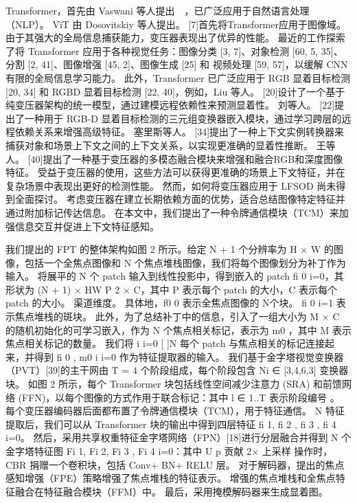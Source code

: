Transformer，首先由 Vaswani 等人提出~\cite{vaswani2017attention}~，已广泛应用于自然语言处理（NLP）。 ViT 由 Dosovitskiy 等人提出。 [7]首先将Transformer应用于图像域。 由于其强大的全局信息捕获能力，变压器表现出了优异的性能。
最近的工作探索了将 Transformer 应用于各种视觉任务：图像分类 [3, 7]、对象检测 [60, 5, 35]、分割 [2, 41]、图像增强 [45, 2]、图像生成 [25] 和 视频处理 [59, 57]，以缓解 CNN 有限的全局信息学习能力。 此外，Transformer 已广泛应用于 RGB 显着目标检测 [20, 34] 和 RGBD 显着目标检测 [22, 40]，例如，Liu 等人。 [20]设计了一个基于纯变压器架构的统一模型，通过建模远程依赖性来预测显着性。 刘等人。 [22]提出了一种用于 RGB-D 显着目标检测的三元组变换器嵌入模块，通过学习跨层的远程依赖关系来增强高级特征。 塞里斯等人。 [34]提出了一种上下文实例转换器来捕获对象和场景上下文之间的上下文关系，以实现更准确的显着性推断。 王等人。 [40]提出了一种基于变压器的多模态融合模块来增强和融合RGB和深度图像特征。 受益于变压器的使用，这些方法可以获得更准确的场景上下文特征，并在复杂场景中表现出更好的检测性能。 然而，如何将变压器应用于 LFSOD 尚未得到全面探讨。 考虑变压器在建立长期依赖方面的优势，适合总结图像特定特征并通过附加标记传达信息。 在本文中，我们提出了一种令牌通信模块（TCM）来加强信息交互并促进上下文特征感知。



我们提出的 FPT 的整体架构如图 2 所示。给定 N + 1 个分辨率为 H × W 的图像，包括一个全焦点图像和 N 个焦点堆栈图像，我们将每个图像划分为补丁作为输入。 将展平的 { }N 个 patch 输入到线性投影中，得到嵌入的 patch fi 0 i=0，其形状为 (N + 1) × HW P 2 × C，其中 P 表示每个 patch 的大小，C 表示每个 patch 的大小。 渠道维度。 具体地，f0 0 表示全焦点图像的{ }N个块。 fi 0 i=1 表示焦点堆栈的斑块。 此外，为了总结补丁中的信息，引入了一组大小为 M × C 的随机初始化的可学习嵌入，作为 { }N 个焦点相关标记，表示为 m0 ，其中 M 表示焦点相关标记的数量。 我们将 i i=0 {[ ]}N 每个 patch 与焦点相关的标记连接起来，并得到 fi 0 , m0 i i=0 作为特征提取器的输入。 我们基于金字塔视觉变换器（PVT）[39]的主干网由 T = 4 个阶段组成，每个阶段包含 Ni ∈ [3,4,6,3] 变换器块。 如图 2 所示，每个 Transformer 块包括线性空间减少注意力 (SRA) 和前馈网络 (FFN)，以每个图像的方式作用于联合标记：其中 l ∈ 1..T 表示阶段编号 。 每个变压器编码器后面都布置了令牌通信模块（TCM），用于特征通信。 { }N 特征提取后，我们可以从 Transformer 块的输出中得到四层特征 fi 1, fi 2 , fi 3 , fi 4 i=0。 然后，采用共享权重特征金字塔网络（FPN）[18]进行分层融合并得到 { }N 个金字塔特征图 Fi 1, Fi 2, Fi 3 , Fi 4 i=0：其中 U p 贡献 2× 上采样 操作时，CBR 捐赠一个卷积块，包括 Conv+ BN+ RELU 层。 对于解码器，提出的焦点感知增强（FPE）策略增强了焦点堆栈的特征表示。 增强的焦点堆栈和全焦点特征融合在特征融合模块（FFM）中。 最后，采用掩模解码器来生成显着图。

